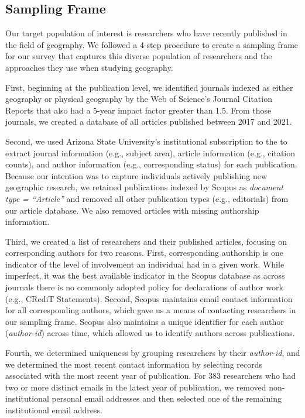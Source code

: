 \documentclass[]{interact}
\newcommand{\citep}{\parencite}
\theoremstyle{plain}%
\theoremstyle{definition}
\theoremstyle{remark}
\begin{document}
\subsection*{Sampling Frame}
Our target population of interest is researchers who have recently published in the field of geography. 
We followed a 4-step procedure to create a sampling frame for our survey that captures this diverse population of researchers and the approaches they use when studying geography. 

First, beginning at the publication level, we identified journals indexed as either geography or physical geography by the Web of Science's Journal Citation Reports \citep{WOS} that also had a 5-year impact factor greater than 1.5.
From those journals, we created a database of all articles published between 2017 and 2021.  

Second, we used Arizona State University's institutional subscription to the \textcite{Scopus} to extract journal information (e.g., subject area), article information (e.g., citation counts), and author information (e.g., corresponding status) for each publication. 
Because our intention was to capture individuals actively publishing new geographic research, we retained publications indexed by Scopus as \textit{document type = ``Article''} and removed all other publication types (e.g., editorials) from our article database. 
We also removed articles with missing authorship information. 

Third, we created a list of researchers and their published articles, focusing on corresponding authors for two reasons.
First, corresponding authorship is one indicator of the level of involvement an individual had in a given work. 
While imperfect, it was the best available indicator in the Scopus database as across journals there is no commonly adopted policy for declarations of author work (e.g., CRediT Statements).
Second, Scopus maintains email contact information for all corresponding authors, which gave us a means of contacting researchers in our sampling frame.
Scopus also maintains a unique identifier for each author (\textit{author-id}) across time, which allowed us to identify authors across publications. 

Fourth, we determined uniqueness by grouping researchers by their \textit{author-id}, and we determined the most recent contact information by selecting records associated with the most recent year of publication. 
For 383 researchers who had two or more distinct emails in the latest year of publication, we removed non-institutional personal email addresses and then selected one of the remaining institutional email address.
\end{document}

